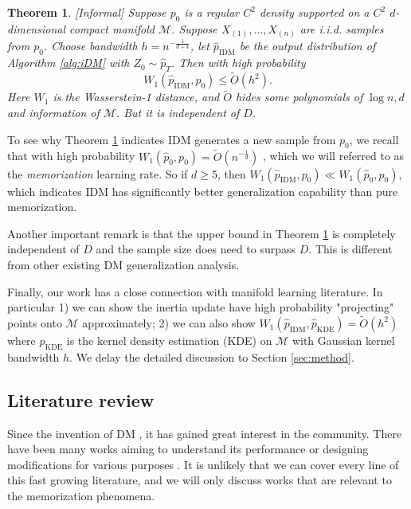 \documentclass{article}
\newtheorem{theorem}{Theorem}[section]
\def\phat{\hat{p}}
\def\Otilde{\widetilde{O}}
\def\calM{\mathcal{M}}
\begin{document}
\begin{theorem}
\label{thm:main1}[Informal]
Suppose $p_0$ is a regular $C^2$ density supported on a $C^2$ $d$-dimensional compact manifold $\calM$.  Suppose $X_{(1)},\ldots, X_{(n)}$ are i.i.d. samples from $p_0$. Choose bandwidth $h=n^{-\frac{1}{d+4}}$, let $\phat_{\text{IDM}}$ be the output distribution of Algorithm \ref{alg:iDM} with $Z_0\sim \phat_T$. Then with high probability 
\[
W_1(\phat_{\text{IDM}},p_0)\leq \Otilde(h^2). 
\]    
Here $W_1$ is the Wasserstein-1 distance, and $\widetilde{O}$ hides some polynomials of $\log n, d$ and information of $\calM$. But it is independent of $D$. 
\end{theorem}

To see why Theorem \ref{thm:main1} indicates IDM generates a new sample from $p_0$, we recall that with high probability $W_1(\phat_0,p_0)=\Otilde(n^{-\frac1d})$ \cite{fournier2015rate}, which we will referred to as the \emph{memorization} learning rate. So if $d\geq 5$, then $W_1(\phat_{\text{IDM}},p_0)\ll W_1(\phat_0,p_0)$, which indicates IDM has significantly better generalization capability than pure memorization. 

Another important remark is that the upper bound in Theorem \ref{thm:main1} is completely independent of $D$ and the sample size does need to surpass $D$. This is different from other existing DM generalization analysis.  

Finally, our work has a close connection with manifold learning literature. In particular  1) we can show the inertia update have high probability "projecting" points onto $\calM$ approximately; 2) we can also show $W_1(\phat_{\text{IDM}},\phat_{\text{KDE}})=\Otilde(h^2)$ where $\phat_{\text{KDE}}$ is the kernel density estimation (KDE) on $\calM$ with Gaussian kernel bandwidth $h$. We delay the detailed discussion to Section \ref{sec:method}.  



\subsection{Literature review}
Since the invention of DM \cite{ho2020denoising,song2020score}, it has gained great interest in the community. There have been many works aiming to understand its performance \cite{chen2022sampling} or designing  modifications for various purposes \cite{graikos2022diffusion}. It is unlikely that we can cover every line of this fast growing literature, and we will only discuss works that are  relevant to the memorization phenomena. 
\end{document}
